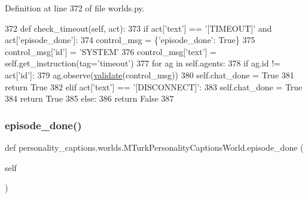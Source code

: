Definition at line 372 of file worlds.\+py.


\begin{DoxyCode}
372     \textcolor{keyword}{def }check\_timeout(self, act):
373         \textcolor{keywordflow}{if} act[\textcolor{stringliteral}{'text'}] == \textcolor{stringliteral}{'[TIMEOUT]'} \textcolor{keywordflow}{and} act[\textcolor{stringliteral}{'episode\_done'}]:
374             control\_msg = \{\textcolor{stringliteral}{'episode\_done'}: \textcolor{keyword}{True}\}
375             control\_msg[\textcolor{stringliteral}{'id'}] = \textcolor{stringliteral}{'SYSTEM'}
376             control\_msg[\textcolor{stringliteral}{'text'}] = self.get\_instruction(tag=\textcolor{stringliteral}{'timeout'})
377             \textcolor{keywordflow}{for} ag \textcolor{keywordflow}{in} self.agents:
378                 \textcolor{keywordflow}{if} ag.id != act[\textcolor{stringliteral}{'id'}]:
379                     ag.observe(\hyperlink{namespaceparlai_1_1core_1_1worlds_afc3fad603b7bce41dbdc9cdc04a9c794}{validate}(control\_msg))
380             self.chat\_done = \textcolor{keyword}{True}
381             \textcolor{keywordflow}{return} \textcolor{keyword}{True}
382         \textcolor{keywordflow}{elif} act[\textcolor{stringliteral}{'text'}] == \textcolor{stringliteral}{'[DISCONNECT]'}:
383             self.chat\_done = \textcolor{keyword}{True}
384             \textcolor{keywordflow}{return} \textcolor{keyword}{True}
385         \textcolor{keywordflow}{else}:
386             \textcolor{keywordflow}{return} \textcolor{keyword}{False}
387 
\end{DoxyCode}
\mbox{\label{classpersonality__captions_1_1worlds_1_1MTurkPersonalityCaptionsWorld_a579f1033a02ede69365f79246a23d8da}} 
\subsubsection{\texorpdfstring{episode\+\_\+done()}{episode\_done()}}
{\footnotesize\ttfamily def personality\+\_\+captions.\+worlds.\+M\+Turk\+Personality\+Captions\+World.\+episode\+\_\+done (\begin{DoxyParamCaption}\item[{}]{self }\end{DoxyParamCaption})}



